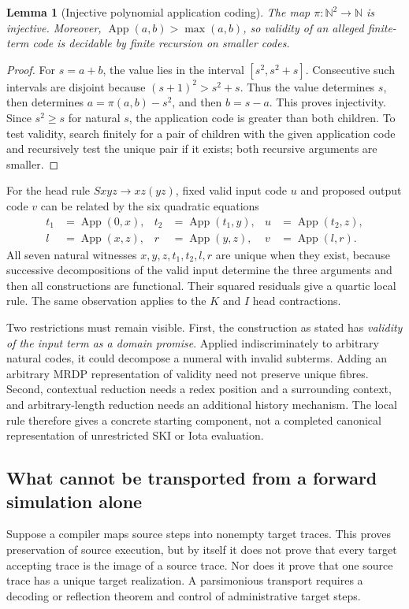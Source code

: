 \documentclass[11pt,a4paper]{article}
\newtheorem{lemma}[lemma]{Lemma}
\theoremstyle{definition}
\theoremstyle{remark}
\newcommand{\N}{\mathbb N}
\begin{document}
\begin{lemma}[Injective polynomial application coding]\label{cdc:ct:lem:pair}
The map $\pi:\N^2\to\N$ is injective. Moreover,
$\operatorname{App}(a,b)>\max(a,b)$, so validity of an alleged finite-term code is decidable by finite recursion on smaller codes.
\end{lemma}
\begin{proof}
For $s=a+b$, the value lies in the interval $[s^2,s^2+s]$. Consecutive such intervals are disjoint because $(s+1)^2>s^2+s$. Thus the value determines $s$, then determines $a=\pi(a,b)-s^2$, and then $b=s-a$. This proves injectivity. Since $s^2\ge s$ for natural $s$, the application code is greater than both children. To test validity, search finitely for a pair of children with the given application code and recursively test the unique pair if it exists; both recursive arguments are smaller.
\end{proof}
For the head rule $Sxyz\to xz(yz)$, fixed valid input code $u$ and proposed output code $v$ can be related by the six quadratic equations
\begin{align*}
 t_1&=\operatorname{App}(0,x),&
 t_2&=\operatorname{App}(t_1,y),&
 u&=\operatorname{App}(t_2,z),\\
 l&=\operatorname{App}(x,z),&
 r&=\operatorname{App}(y,z),&
 v&=\operatorname{App}(l,r).
\end{align*}
All seven natural witnesses $x,y,z,t_1,t_2,l,r$ are unique when they exist, because successive decompositions of the valid input determine the three arguments and then all constructions are functional. Their squared residuals give a quartic local rule. The same observation applies to the $K$ and $I$ head contractions.

Two restrictions must remain visible. First, the construction as stated has \emph{validity of the input term as a domain promise}. Applied indiscriminately to arbitrary natural codes, it could decompose a numeral with invalid subterms. Adding an arbitrary MRDP representation of validity need not preserve unique fibres. Second, contextual reduction needs a redex position and a surrounding context, and arbitrary-length reduction needs an additional history mechanism. The local rule therefore gives a concrete starting component, not a completed canonical representation of unrestricted SKI or Iota evaluation.

\subsection{What cannot be transported from a forward simulation alone}
Suppose a compiler maps source steps into nonempty target traces. This proves preservation of source execution, but by itself it does not prove that every target accepting trace is the image of a source trace. Nor does it prove that one source trace has a unique target realization. A parsimonious transport requires a decoding or reflection theorem and control of administrative target steps.
\end{document}
